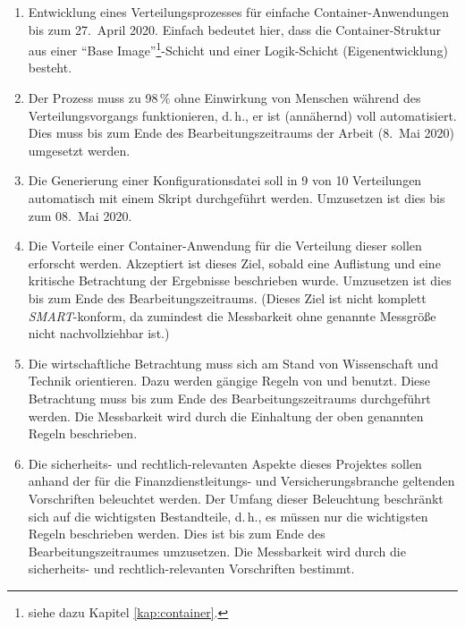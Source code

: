 \begin{enumerate}
	\item Entwicklung eines Verteilungsprozesses für einfache Container-Anwendungen bis zum 27.~April 2020. Einfach bedeutet hier, dass die Container-Struktur aus einer \enquote{Base Image}\footnote{siehe dazu Kapitel \vref{kap:container}.}-Schicht und einer Logik-Schicht (Eigenentwicklung) besteht.
	\item Der Prozess muss zu 98\,\% ohne Einwirkung von Menschen während des Verteilungsvorgangs funktionieren, d.\,h., er ist (annähernd) voll automatisiert. Dies muss bis zum Ende des Bearbeitungszeitraums der Arbeit (8.~Mai 2020) umgesetzt werden.
	\item Die Generierung einer Konfigurationsdatei soll in 9 von 10 Verteilungen automatisch mit einem Skript durchgeführt werden. Umzusetzen ist dies bis zum 08.~Mai 2020.
	\item Die Vorteile einer Container-Anwendung für die Verteilung dieser sollen erforscht werden. Akzeptiert ist dieses Ziel, sobald eine Auflistung und eine kritische Betrachtung der Ergebnisse beschrieben wurde. Umzusetzen ist dies bis zum Ende des Bearbeitungszeitraums. (Dieses Ziel ist nicht komplett \textit{SMART}-konform, da zumindest die Messbarkeit ohne genannte Messgröße nicht nachvollziehbar ist.)
	\item Die wirtschaftliche Betrachtung muss sich am Stand von Wissenschaft und Technik orientieren. Dazu werden gängige Regeln von \cite{herman_is_2009} und \cite{brugger_it_2009} benutzt. Diese Betrachtung muss bis zum Ende des Bearbeitungszeitraums durchgeführt werden. Die Messbarkeit wird durch die Einhaltung der oben genannten Regeln beschrieben.
	\item Die sicherheits- und rechtlich-relevanten Aspekte dieses Projektes sollen anhand der für die Finanzdienstleitungs- und Versicherungsbranche geltenden Vorschriften beleuchtet werden. Der Umfang dieser Beleuchtung beschränkt sich auf die wichtigsten Bestandteile, d.\,h., es müssen nur die wichtigsten Regeln beschrieben werden. Dies ist bis zum Ende des Bearbeitungszeitraumes umzusetzen. Die Messbarkeit wird durch die sicherheits- und rechtlich-relevanten Vorschriften bestimmt.
\end{enumerate}

